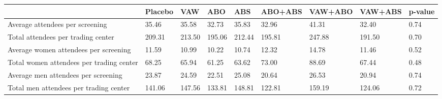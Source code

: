 \begin{tabular}{p{4cm}p{1cm}p{1cm}p{1cm}p{1cm}p{2cm}p{2cm}p{2cm}p{1.5cm}}
  \hline
 & Placebo & VAW & ABO & ABS & ABO+ABS & VAW+ABO & VAW+ABS & p-value \\ 
  \hline
Average attendees per screening & 35.46 & 35.58 & 32.73 & 35.83 & 32.96 & 41.31 & 32.40 & 0.74 \\ 
  Total attendees per trading center & 209.31 & 213.50 & 195.06 & 212.44 & 195.81 & 247.88 & 191.50 & 0.70 \\ 
  Average women attendees per screening & 11.59 & 10.99 & 10.22 & 10.74 & 12.32 & 14.78 & 11.46 & 0.52 \\ 
  Total women attendees per trading center & 68.25 & 65.94 & 61.25 & 63.62 & 73.00 & 88.69 & 67.44 & 0.48 \\ 
  Average men attendees per screening & 23.87 & 24.59 & 22.51 & 25.08 & 20.64 & 26.53 & 20.94 & 0.74 \\ 
  Total men attendees per trading center & 141.06 & 147.56 & 133.81 & 148.81 & 122.81 & 159.19 & 124.06 & 0.72 \\ 
   \hline
\end{tabular}
